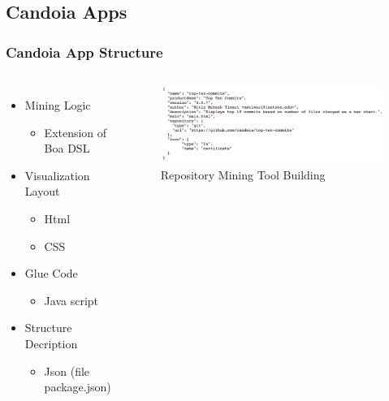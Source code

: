     \subsection{Candoia Apps}
        \begin{frame}
        \frametitle{Candoia App Structure}
        \begin{columns}
                \begin{itemize}
                  \item Mining Logic
                    \begin{itemize}
                        \item Extension of Boa DSL
                    \end{itemize}
                  \item Visualization Layout
                    \begin{itemize}
                        \item Html
                        \item CSS
                    \end{itemize}
                  \item Glue Code
                    \begin{itemize}
                        \item Java script
                    \end{itemize}
                  \item Structure Decription
                    \begin{itemize}
                        \item Json (file package.json)
                    \end{itemize}
                \end{itemize}

                \begin{figure}
                    \centering
                    \includegraphics[scale=0.30]{figures/structure.png}
                    \caption{Repository Mining Tool Building}
                \end{figure}
        \end{columns}
        \end{frame}

